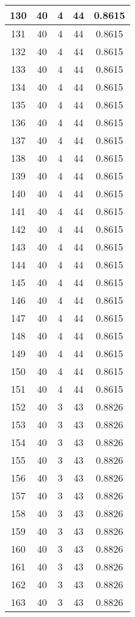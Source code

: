 \documentclass[letterpaper, 12pt]{article}
\begin{document}
\begin{longtable}{|c|c|c|c|c|}
\hline
130 & 40 & 4 & 44 & 0.8615 \\
\hline
131 & 40 & 4 & 44 & 0.8615 \\
\hline
132 & 40 & 4 & 44 & 0.8615 \\
\hline
133 & 40 & 4 & 44 & 0.8615 \\
\hline
134 & 40 & 4 & 44 & 0.8615 \\
\hline
135 & 40 & 4 & 44 & 0.8615 \\
\hline
136 & 40 & 4 & 44 & 0.8615 \\
\hline
137 & 40 & 4 & 44 & 0.8615 \\
\hline
138 & 40 & 4 & 44 & 0.8615 \\
\hline
139 & 40 & 4 & 44 & 0.8615 \\
\hline
140 & 40 & 4 & 44 & 0.8615 \\
\hline
141 & 40 & 4 & 44 & 0.8615 \\
\hline
142 & 40 & 4 & 44 & 0.8615 \\
\hline
143 & 40 & 4 & 44 & 0.8615 \\
\hline
144 & 40 & 4 & 44 & 0.8615 \\
\hline
145 & 40 & 4 & 44 & 0.8615 \\
\hline
146 & 40 & 4 & 44 & 0.8615 \\
\hline
147 & 40 & 4 & 44 & 0.8615 \\
\hline
148 & 40 & 4 & 44 & 0.8615 \\
\hline
149 & 40 & 4 & 44 & 0.8615 \\
\hline
150 & 40 & 4 & 44 & 0.8615 \\
\hline
151 & 40 & 4 & 44 & 0.8615 \\
\hline
152 & 40 & 3 & 43 & 0.8826 \\
\hline
153 & 40 & 3 & 43 & 0.8826 \\
\hline
154 & 40 & 3 & 43 & 0.8826 \\
\hline
155 & 40 & 3 & 43 & 0.8826 \\
\hline
156 & 40 & 3 & 43 & 0.8826 \\
\hline
157 & 40 & 3 & 43 & 0.8826 \\
\hline
158 & 40 & 3 & 43 & 0.8826 \\
\hline
159 & 40 & 3 & 43 & 0.8826 \\
\hline
160 & 40 & 3 & 43 & 0.8826 \\
\hline
161 & 40 & 3 & 43 & 0.8826 \\
\hline
162 & 40 & 3 & 43 & 0.8826 \\
\hline
163 & 40 & 3 & 43 & 0.8826 \\

\end{longtable}
\end{document}
